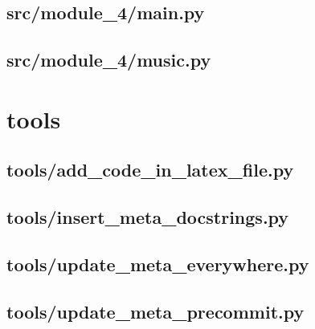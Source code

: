 \subsection*{src/module\_4/main.py}
\label{ap:module_4-main}

\subsection*{src/module\_4/music.py}
\label{ap:music}
\section{tools}

\subsection*{tools/add\_code\_in\_latex\_file.py}
\label{ap:add_code_in_latex_file}

\subsection*{tools/insert\_meta\_docstrings.py}
\label{ap:insert_meta_docstrings}

\subsection*{tools/update\_meta\_everywhere.py}
\label{ap:update_meta_everywhere}

\subsection*{tools/update\_meta\_precommit.py}
\label{ap:update_meta_precommit}
